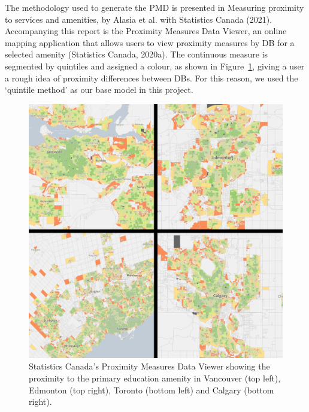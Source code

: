 \documentclass[11pt, a4paper]{article}
\begin{document}
The methodology used to generate the PMD is presented in Measuring proximity to services and amenities, by Alasia et al. with Statistics Canada (2021). Accompanying this report is the Proximity Measures Data Viewer, an online mapping application that allows users to view proximity measures by DB for a selected amenity (Statistics Canada, 2020a). The continuous measure is segmented by quintiles and assigned a colour, as shown in Figure~\ref{pmdviewer}, giving a user a rough idea of proximity differences between DBs. For this reason, we used the `quintile method' as our base model in this project.



\begin{figure}[H]
\centering
\includegraphics[width=\textwidth]{./PMD_viewer/PMD_viewer2.png}
\caption[Proximity Measures Data Viewer]{Statistics Canada’s Proximity Measures Data Viewer showing the proximity to the primary education amenity in Vancouver (top left), Edmonton (top right), Toronto (bottom left) and Calgary (bottom right).}\label{pmdviewer}
\end{figure}
\end{document}
